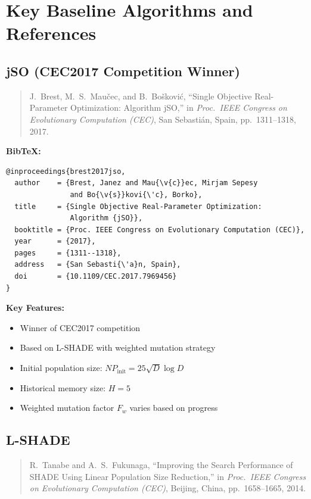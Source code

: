 \documentclass[11pt]{article}
\begin{document}
\section{Key Baseline Algorithms and References}

\subsection{jSO (CEC2017 Competition Winner)}

\begin{quote}
J.~Brest, M.~S.~Mau\v{c}ec, and B.~Bo\v{s}kovi\'{c}, 
``Single Objective Real-Parameter Optimization: Algorithm jSO,'' 
in \textit{Proc.~IEEE Congress on Evolutionary Computation (CEC)}, 
San Sebasti\'{a}n, Spain, pp.~1311--1318, 2017.
\end{quote}

\noindent\textbf{BibTeX:}
\begin{verbatim}
@inproceedings{brest2017jso,
  author    = {Brest, Janez and Mau{\v{c}}ec, Mirjam Sepesy 
               and Bo{\v{s}}kovi{\'c}, Borko},
  title     = {Single Objective Real-Parameter Optimization: 
               Algorithm {jSO}},
  booktitle = {Proc. IEEE Congress on Evolutionary Computation (CEC)},
  year      = {2017},
  pages     = {1311--1318},
  address   = {San Sebasti{\'a}n, Spain},
  doi       = {10.1109/CEC.2017.7969456}
}
\end{verbatim}

\noindent\textbf{Key Features:}
\begin{itemize}
    \item Winner of CEC2017 competition
    \item Based on L-SHADE with weighted mutation strategy
    \item Initial population size: $NP_{\text{init}} = 25 \sqrt{D} \log D$
    \item Historical memory size: $H = 5$
    \item Weighted mutation factor $F_w$ varies based on progress
\end{itemize}

\subsection{L-SHADE}

\begin{quote}
R.~Tanabe and A.~S.~Fukunaga, 
``Improving the Search Performance of SHADE Using Linear Population Size Reduction,'' 
in \textit{Proc.~IEEE Congress on Evolutionary Computation (CEC)}, 
Beijing, China, pp.~1658--1665, 2014.
\end{quote}
\end{document}
